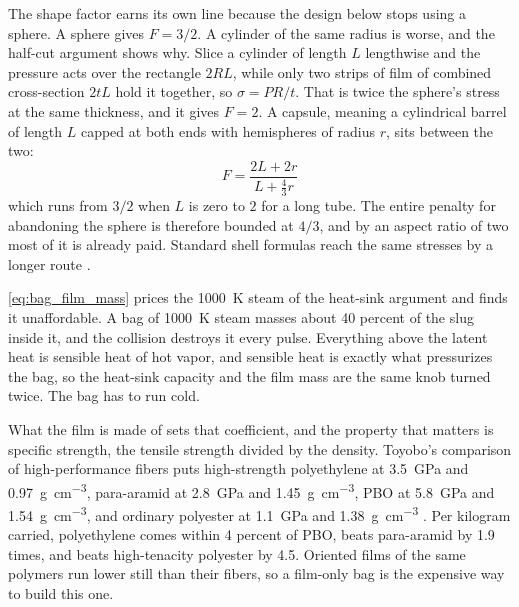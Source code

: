 \documentclass{article}
\begin{document}
The shape factor earns its own line because the design below stops using a sphere. A sphere gives $F = 3/2$. A cylinder of the same radius is worse, and the half-cut argument shows why. Slice a cylinder of length $L$ lengthwise and the pressure acts over the rectangle $2RL$, while only two strips of film of combined cross-section $2tL$ hold it together, so $\sigma = PR/t$. That is twice the sphere's stress at the same thickness, and it gives $F = 2$. A capsule, meaning a cylindrical barrel of length $L$ capped at both ends with hemispheres of radius $r$, sits between the two:
\begin{equation}\label{eq:bag_shape_factor}
F = \frac{2L + 2r}{L + \tfrac{4}{3}r}
\end{equation}
which runs from $3/2$ when $L$ is zero to $2$ for a long tube. The entire penalty for abandoning the sphere is therefore bounded at $4/3$, and by an aspect ratio of two most of it is already paid. Standard shell formulas reach the same stresses by a longer route \cite{young2011roark}.

\autoref{eq:bag_film_mass} prices the \SI{1000}{\kelvin} steam of the heat-sink argument and finds it unaffordable. A bag of \SI{1000}{\kelvin} steam masses about 40 percent of the slug inside it, and the collision destroys it every pulse. Everything above the latent heat is sensible heat of hot vapor, and sensible heat is exactly what pressurizes the bag, so the heat-sink capacity and the film mass are the same knob turned twice. The bag has to run cold.

What the film is made of sets that coefficient, and the property that matters is specific strength, the tensile strength divided by the density. Toyobo's comparison of high-performance fibers puts high-strength polyethylene at \SI{3.5}{\giga\pascal} and \SI{0.97}{\gram\per\cubic\centi\meter}, para-aramid at \SI{2.8}{\giga\pascal} and \SI{1.45}{\gram\per\cubic\centi\meter}, PBO at \SI{5.8}{\giga\pascal} and \SI{1.54}{\gram\per\cubic\centi\meter}, and ordinary polyester at \SI{1.1}{\giga\pascal} and \SI{1.38}{\gram\per\cubic\centi\meter} \cite{toyobo_zylon}. Per kilogram carried, polyethylene comes within 4 percent of PBO, beats para-aramid by 1.9 times, and beats high-tenacity polyester by 4.5. Oriented films of the same polymers run lower still than their fibers, so a film-only bag is the expensive way to build this one.
\end{document}
